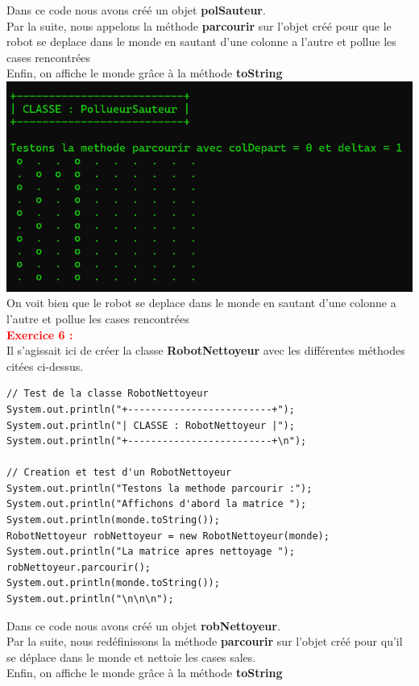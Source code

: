 \documentclass{article}
\begin{document}
Dans ce code nous avons créé un objet \textbf{polSauteur}.\\
Par la suite, nous appelons la méthode \textbf{parcourir} sur l'objet créé pour que le robot se deplace dans le monde en sautant d'une colonne a l'autre et pollue les cases rencontrées\\
Enfin, on affiche le monde grâce à la méthode \textbf{toString}\\

\includegraphics[scale=0.5]{../images/exo5.png}\\
On voit bien que le robot se deplace dans le monde en sautant d'une colonne a l'autre et pollue les cases rencontrées\\

\textcolor{red}{\textbf{\Large{Exercice 6 :}}}\\
Il s'agissait ici de créer la classe \textbf{RobotNettoyeur} avec les différentes méthodes citées ci-dessus.\\
\begin{lstlisting}
// Test de la classe RobotNettoyeur
System.out.println("+-------------------------+");
System.out.println("| CLASSE : RobotNettoyeur |");
System.out.println("+-------------------------+\n");

// Creation et test d'un RobotNettoyeur
System.out.println("Testons la methode parcourir :");
System.out.println("Affichons d'abord la matrice ");
System.out.println(monde.toString());
RobotNettoyeur robNettoyeur = new RobotNettoyeur(monde);
System.out.println("La matrice apres nettoyage ");
robNettoyeur.parcourir();
System.out.println(monde.toString());
System.out.println("\n\n\n");
\end{lstlisting}

Dans ce code nous avons créé un objet \textbf{robNettoyeur}.\\
Par la suite, nous redéfinissons la méthode \textbf{parcourir} sur l'objet créé pour qu'il se déplace dans le monde et nettoie les cases sales.\\
Enfin, on affiche le monde grâce à la méthode \textbf{toString}\\
\end{document}
